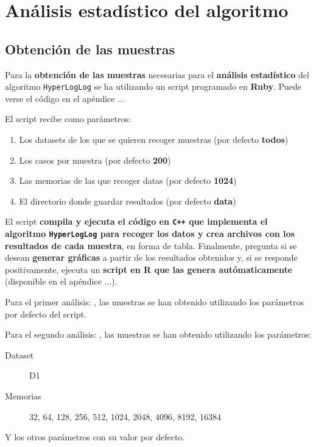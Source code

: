 % 
\section{Análisis estadístico del algoritmo}
\label{analisis}

\subsection{Obtención de las muestras}
Para la \textbf{obtención de las muestras} necesarias para el \textbf{análisis estadístico} del algoritmo \texttt{HyperLogLog}
se ha utilizando un script programado en \textbf{Ruby}. Puede verse el código en el apéndice ...

El script recibe como parámetros:
\begin{enumerate}
\item Los datasets de los que se quieren recoger muestras (por defecto \textbf{todos})
\item Los casos por muestra (por defecto \textbf{200})
\item Las memorias de las que recoger datas (por defecto \textbf{1024})
\item El directorio donde guardar resultados (por defecto \textbf{data})
\end{enumerate}

El script \textbf{compila y ejecuta el código en \texttt{C++} que implementa el algoritmo \texttt{HyperLogLog} para recoger los datos
y crea archivos con los resultados de cada muestra}, en forma de tabla. Finalmente, pregunta si se desean
\textbf{generar gráficas} a partir de los resultados obtenidos y, si se responde positivamente, ejecuta un \textbf{script en R que las genera autómaticamente} (disponible en el apéndice ...).

Para el primer análisis: \textbf{}, las muestras se han obtenido utilizando los parámetros por defecto del script.

Para el segundo análisis: \textbf{}, las muestras se han obtenido utilizando los parámetros:
\begin{description}
\item[Dataset] D1
\item[Memorias] 32, 64, 128, 256, 512, 1024, 2048, 4096, 8192, 16384
\end{description}

Y los otros parámetros con su valor por defecto.

